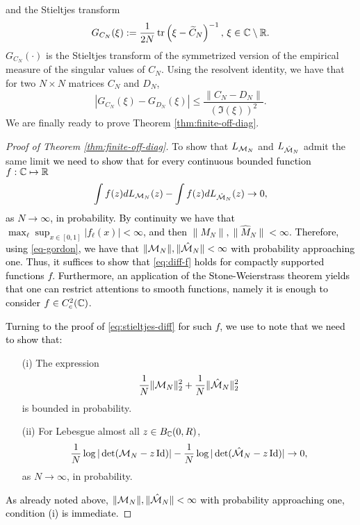\documentclass{amsart}
\numberwithin{equation}{section}
\def\corABrev{\textcolor{black}}
\begin{document}
and the Stieltjes transform
\[
  G_{C_N}(\xi):= \frac{1}{2N}\operatorname{tr} \left(\xi- \widetilde{C}_N \right)^{-1}, \, \xi \in \mathbb{C} \setminus \mathbb{R}.
\]
$G_{C_N}(\cdot)$ is the Stieltjes transform
of the symmetrized version of the empirical measure of the singular values of $C_N$. %
Using the resolvent identity, we have that
for two $N \times N$ matrices $C_N$ and $D_N$,
\begin{equation}\label{eq:stieltjes-diff}
  |G_{C_N}(\xi) - G_{D_N}(\xi)| \le \frac{\|C_N -D_N\|}{(\Im (\xi))^2}.
\end{equation}
We are finally ready to prove Theorem \ref{thm:finite-off-diag}.
\begin{proof}[Proof of Theorem \ref{thm:finite-off-diag}]
To show that $L_{\mathcal{M}_N}$ and $L_{\hat{\mathcal{M}}_N}$ admit the same limit \corABrev{we need to show that for every continuous bounded function $f : \mathbb{C} \mapsto \mathbb{R}$
\begin{equation}\label{eq:diff-f}
\int f(z) dL_{\mathcal{M}_N}(z) - \int f(z) dL_{\hat{\mathcal{M}}_N}(z) \to 0,
\end{equation}
as $N \to \infty$, in probability. By continuity we have that
$\max_\ell \sup_{x \in [0,1]} |f_\ell(x)| <\infty$, and then
$\|M_N\|, \|\hat{M}_N\| <\infty$. Therefore, using \eqref{eq-gordon}, we have that
$\|\mathcal{M}_N\|, \|\hat{\mathcal{M}}_N\| <\infty$ with probability approaching one. Thus, it suffices to show that \eqref{eq:diff-f} holds for compactly supported functions $f$. Furthermore, an application of the Stone-Weierstrass theorem yields that one can restrict attentions to smooth functions, namely it is enough to consider $f \in C_c^2(\mathbb{C})$.} 

\corABrev{Turning to the proof of \eqref{eq:stieltjes-diff} for such $f$, we use \cite[Lemma 8.1]{BCZ} to note that we need to show that:}
\begin{enumerate}
\item[(i)] The expression
\[
\frac{1}{N}\|\mathcal{M}_N\|_2^2 + \frac{1}{N}\|\hat{\mathcal{M}}_N\|_2^2
\]
is bounded in probability.
\item[(ii)] For Lebesgue almost all $z \in B_{\mathbb{C}}(0,R)$,
\[
\frac{1}{N} \log |\det(\mathcal{M}_N - z \operatorname{Id})| - \frac{1}{N} \log |\det(\hat{\mathcal{M}}_N - z \operatorname{Id})|  \to 0,
\]
as $N \to \infty$, in probability.
\end{enumerate}
\vskip5pt
\corABrev{As already noted above, $\|\mathcal{M}_N\|, \|\hat {\mathcal{M}}_N\| < \infty$ with probability approaching one, condition (i) is immediate.} 


\end{proof}
\end{document}
